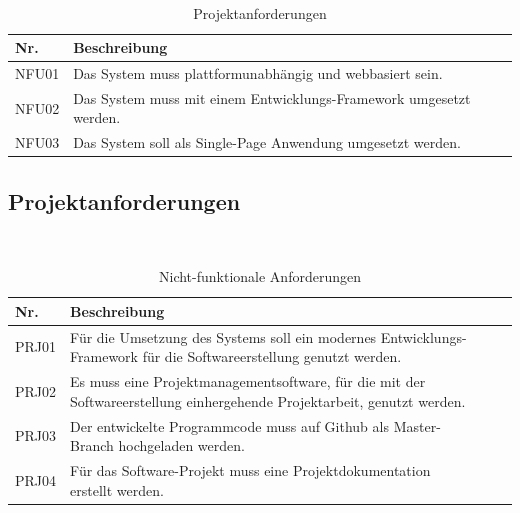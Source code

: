 \documentclass[a4paper, 11pt]{scrreprt}
\begin{document}
\begin{table}[H]

\caption{Projektanforderungen}

\ \\

\par

\label{tab:Tabelle1}

\centering

\begin{tabular}{|p{2.5cm} p{12cm}| ll}

\hline
Nr.	& Beschreibung\\

\hline
NFU01 &	Das System muss plattformunabhängig und webbasiert sein. \\

\hline
NFU02 &	Das System muss mit einem Entwicklungs-Framework umgesetzt werden.\\

\hline
NFU03 &	Das System soll als Single-Page Anwendung umgesetzt werden.\\

\hline

\end{tabular}

\end{table}

\subsection{Projektanforderungen}

\begin{table}[H]

\caption{Nicht-funktionale Anforderungen}

\ \\

\par

\label{tab:Tabelle1}

\centering

\begin{tabular}{|p{2.5cm} p{12cm}| ll}

\hline
Nr. &	Beschreibung\\

\hline
PRJ01 &	Für die Umsetzung des Systems soll ein modernes Entwicklungs-Framework für die Softwareerstellung genutzt werden.\\
PRJ02 &	Es muss eine Projektmanagementsoftware, für die mit der Softwareerstellung einhergehende Projektarbeit, genutzt werden.\\

\hline
PRJ03 &	Der entwickelte Programmcode muss auf Github als Master-Branch hochgeladen werden.\\

\hline
PRJ04 &	Für das Software-Projekt muss eine Projektdokumentation erstellt werden.\\

\hline
\end{tabular}

\end{table}
\end{document}
